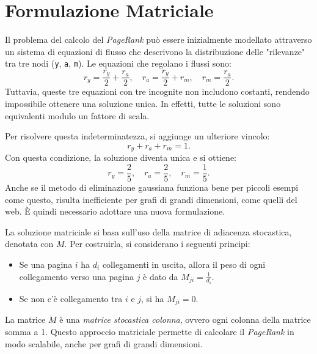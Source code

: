 \documentclass{report}
\begin{document}
	\section{Formulazione Matriciale}
	Il problema del calcolo del \textit{PageRank} può essere inizialmente modellato attraverso un sistema di equazioni di flusso che descrivono la distribuzione delle "rilevanze" tra tre nodi (\texttt{y}, \texttt{a}, \texttt{m}). Le equazioni che regolano i flussi sono:
	\[
	r_y = \frac{r_y}{2} + \frac{r_a}{2}, \quad
	r_a = \frac{r_y}{2} + r_m, \quad
	r_m = \frac{r_a}{2}.
	\]
	Tuttavia, queste tre equazioni con tre incognite non includono costanti, rendendo impossibile ottenere una soluzione unica. In effetti, tutte le soluzioni sono equivalenti modulo un fattore di scala.

	Per risolvere questa indeterminatezza, si aggiunge un ulteriore vincolo:
	\[
	r_y + r_a + r_m = 1.
	\]
	Con questa condizione, la soluzione diventa unica e si ottiene:
	\[
	r_y = \frac{2}{5}, \quad r_a = \frac{2}{5}, \quad r_m = \frac{1}{5}.
	\]
	Anche se il metodo di eliminazione gaussiana funziona bene per piccoli esempi come questo, risulta inefficiente per grafi di grandi dimensioni, come quelli del web. È quindi necessario adottare una nuova formulazione.

	La soluzione matriciale si basa sull'uso della matrice di adiacenza stocastica, denotata con $M$. Per costruirla, si considerano i seguenti principi:
	\begin{itemize}
		\item Se una pagina $i$ ha $d_i$ collegamenti in uscita, allora il peso di ogni collegamento verso una pagina $j$ è dato da $M_{ji} = \frac{1}{d_i}$.
		\item Se non c'è collegamento tra $i$ e $j$, si ha $M_{ji} = 0$.
	\end{itemize}
	La matrice $M$ è una \textit{matrice stocastica colonna}, ovvero ogni colonna della matrice somma a 1. Questo approccio matriciale permette di calcolare il \textit{PageRank} in modo scalabile, anche per grafi di grandi dimensioni.
\end{document}
